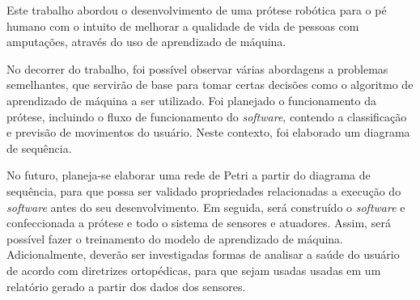 Este trabalho abordou o desenvolvimento de uma prótese robótica para o pé humano com o intuito de melhorar a qualidade de vida de pessoas com amputações, através do uso de aprendizado de máquina.

No decorrer do trabalho, foi possível observar várias abordagens a problemas semelhantes, que servirão de base para tomar certas decisões como o algoritmo de aprendizado de máquina a ser utilizado.
% 
Foi planejado o funcionamento da prótese, incluindo o fluxo de funcionamento do \textit{software}, contendo a classificação e previsão de movimentos do usuário. Neste contexto, foi elaborado um diagrama de sequência.

No futuro, planeja-se elaborar uma rede de Petri a partir do diagrama de sequência, para que possa ser validado propriedades relacionadas a execução do \textit{software} antes do seu desenvolvimento. Em seguida, será construído o \textit{software} e confeccionada a prótese e todo o sistema de sensores e atuadores. Assim, será possível fazer o treinamento do modelo de aprendizado de máquina.
% 
Adicionalmente, deverão ser investigadas formas de analisar a saúde do usuário de acordo com diretrizes ortopédicas, para que sejam usadas usadas em um relatório gerado a partir dos dados dos sensores.